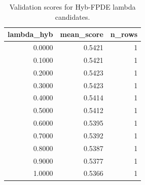 \begin{table}[t]
\caption{Validation scores for Hyb-FPDE lambda candidates.}
\label{tab:lambda_distribution_computed}
\centering
\begin{tabular}{rrr}
\toprule
lambda\_hyb & mean\_score & n\_rows \\
\midrule
0.0000 & 0.5421 & 1 \\
0.1000 & 0.5421 & 1 \\
0.2000 & 0.5423 & 1 \\
0.3000 & 0.5423 & 1 \\
0.4000 & 0.5414 & 1 \\
0.5000 & 0.5412 & 1 \\
0.6000 & 0.5395 & 1 \\
0.7000 & 0.5392 & 1 \\
0.8000 & 0.5387 & 1 \\
0.9000 & 0.5377 & 1 \\
1.0000 & 0.5366 & 1 \\
\bottomrule
\end{tabular}

\end{table}
